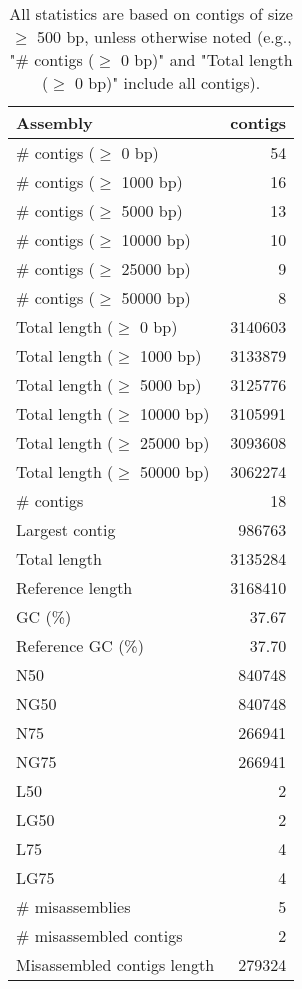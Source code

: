 \documentclass[12pt,a4paper]{article}
\begin{document}
\begin{table}[ht]
\begin{center}
\caption{All statistics are based on contigs of size $\geq$ 500 bp, unless otherwise noted (e.g., "\# contigs ($\geq$ 0 bp)" and "Total length ($\geq$ 0 bp)" include all contigs).}
\begin{tabular}{|l*{1}{|r}|}
\hline
Assembly & contigs \\ \hline
\# contigs ($\geq$ 0 bp) & 54 \\ \hline
\# contigs ($\geq$ 1000 bp) & 16 \\ \hline
\# contigs ($\geq$ 5000 bp) & 13 \\ \hline
\# contigs ($\geq$ 10000 bp) & 10 \\ \hline
\# contigs ($\geq$ 25000 bp) & 9 \\ \hline
\# contigs ($\geq$ 50000 bp) & 8 \\ \hline
Total length ($\geq$ 0 bp) & 3140603 \\ \hline
Total length ($\geq$ 1000 bp) & 3133879 \\ \hline
Total length ($\geq$ 5000 bp) & 3125776 \\ \hline
Total length ($\geq$ 10000 bp) & 3105991 \\ \hline
Total length ($\geq$ 25000 bp) & 3093608 \\ \hline
Total length ($\geq$ 50000 bp) & 3062274 \\ \hline
\# contigs & 18 \\ \hline
Largest contig & 986763 \\ \hline
Total length & 3135284 \\ \hline
Reference length & 3168410 \\ \hline
GC (\%) & 37.67 \\ \hline
Reference GC (\%) & 37.70 \\ \hline
N50 & 840748 \\ \hline
NG50 & 840748 \\ \hline
N75 & 266941 \\ \hline
NG75 & 266941 \\ \hline
L50 & 2 \\ \hline
LG50 & 2 \\ \hline
L75 & 4 \\ \hline
LG75 & 4 \\ \hline
\# misassemblies & 5 \\ \hline
\# misassembled contigs & 2 \\ \hline
Misassembled contigs length & 279324 \\ \hline

\end{tabular}
\end{center}
\end{table}
\end{document}
